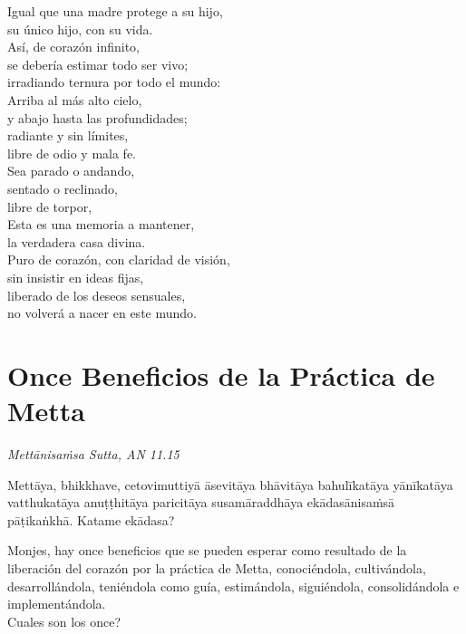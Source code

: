 Igual que una madre protege a su hijo,\\
su único hijo, con su vida.\\
Así, de corazón infinito,\\
se debería estimar todo ser vivo;\\
irradiando ternura por todo el mundo:\\
Arriba al más alto cielo,\\
y abajo hasta las profundidades;\\
radiante y sin límites,\\
libre de odio y mala fe.\\
Sea parado o andando,\\
sentado o reclinado,\\
libre de torpor,\\
Esta es una memoria a mantener,\\
la verdadera casa divina.\\

Puro de corazón, con claridad de visión,\\
sin insistir en ideas fijas,\\
liberado de los deseos sensuales,\\
no volverá a nacer en este mundo.

\chapter[Once Beneficios]{Once Beneficios de la Práctica de Metta}

\emph{Mettānisaṁsa Sutta, AN 11.15}


\begin{leader}
\end{leader}

Mettāya, bhikkhave, cetovimuttiyā āsevitāya bhāvitāya bahulīkatāya yānīkatāya vatthukatāya anuṭṭhitāya paricitāya susamāraddhāya ekādasānisaṁsā pāṭikaṅkhā. Katame ekādasa?

\begin{english}
  Monjes, hay once beneficios que se pueden esperar como resultado de la liberación del corazón por la práctica de Metta, conociéndola, cultivándola, desarrollándola, teniéndola como guía, estimándola, siguiéndola, consolidándola e implementándola.\\
  Cuales son los once?
\end{english}

